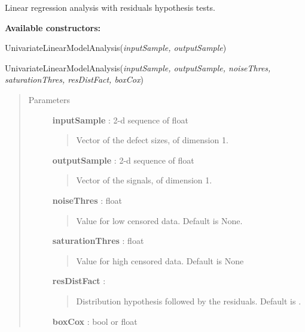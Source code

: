 \documentclass[letterpaper,10pt,english]{sphinxmanual}
\begin{document}
\begin{fulllineitems}
\label{_generated/otpod.UnivariateLinearModelAnalysis:otpod.UnivariateLinearModelAnalysis}
Linear regression analysis with residuals hypothesis tests.

\textbf{Available constructors:}

UnivariateLinearModelAnalysis(\emph{inputSample, outputSample})

UnivariateLinearModelAnalysis(\emph{inputSample, outputSample, noiseThres,
saturationThres, resDistFact, boxCox})
\begin{quote}\begin{description}
\item[{Parameters}] \leavevmode
\textbf{inputSample} : 2-d sequence of float
\begin{quote}

Vector of the defect sizes, of dimension 1.
\end{quote}

\textbf{outputSample} : 2-d sequence of float
\begin{quote}

Vector of the signals, of dimension 1.
\end{quote}

\textbf{noiseThres} : float
\begin{quote}

Value for low censored data. Default is None.
\end{quote}

\textbf{saturationThres} : float
\begin{quote}

Value for high censored data. Default is None
\end{quote}

\textbf{resDistFact} : \href{http://doc.openturns.org/openturns-latest/sphinx/user\_manual/\_generated/openturns.DistributionFactory.html\#openturns.DistributionFactory}{}
\begin{quote}

Distribution hypothesis followed by the residuals. Default is 
\href{http://doc.openturns.org/openturns-latest/sphinx/user\_manual/\_generated/openturns.NormalFactory.html\#openturns.NormalFactory}{}.
\end{quote}

\textbf{boxCox} : bool or float
\begin{quote}


\end{quote}
\end{description}
\end{quote}
\end{fulllineitems}
\end{document}
